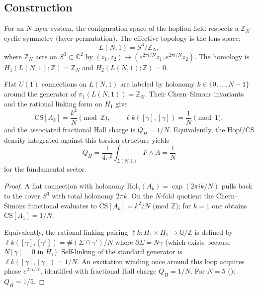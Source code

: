 \documentclass[11pt,letterpaper]{article}
\begin{document}
\subsection{Construction}

For an $N$-layer \TEVC{} system, the configuration space of the hopfion field respects a $\mathbb{Z}_N$ cyclic symmetry (layer permutation). The effective topology is the lens space:
\begin{equation}
L(N,1) = S^3 / \mathbb{Z}_N,
\end{equation}
where $\mathbb{Z}_N$ acts on $S^3 \subset \mathbb{C}^2$ by $(z_1, z_2) \mapsto (e^{2\pi i/N} z_1, e^{2\pi i/N} z_2)$. The homology is $H_1(L(N,1);\mathbb{Z})=\mathbb{Z}_N$ and $H_2(L(N,1);\mathbb{Z})=0$.

\begin{theorem}
\label{thm:lens_hopf}
Flat $U(1)$ connections on $L(N,1)$ are labeled by holonomy $k\in\{0,\ldots,N-1\}$ around the generator of $\pi_1(L(N,1))=\mathbb{Z}_N$. Their Chern--Simons invariants and the rational linking form on $H_1$ give
\begin{equation}
\mathrm{CS}[A_k]=\frac{k^2}{N}\pmod{\mathbb{Z}},\qquad
\ell\!k([\gamma],[\gamma])=\frac{1}{N}\pmod{1},
\end{equation}
and the associated fractional Hall charge is $Q_H=1/N$. Equivalently, the Hopf/CS density integrated against this torsion structure yields
\begin{equation}
Q_H = \frac{1}{4\pi^2} \int_{L(N,1)} F \wedge A = \frac{1}{N}
\end{equation}
for the fundamental sector.
\end{theorem}

\begin{proof}
A flat connection with holonomy $\mathrm{Hol}_\gamma(A_k)=\exp(2\pi i k/N)$ pulls back to the cover $S^3$ with total holonomy $2\pi k$. On the $N$-fold quotient the Chern--Simons functional evaluates to $\mathrm{CS}[A_k]=k^2/N$ (mod $\mathbb{Z}$)\cite{Witten1989,Jeffrey1992}; for $k=1$ one obtains $\mathrm{CS}[A_1]=1/N$.

Equivalently, the rational linking pairing $\ell\!k:H_1\times H_1\to\mathbb{Q}/\mathbb{Z}$ is defined by $\ell\!k([\gamma],[\gamma'])=\#(\Sigma\cap\gamma')/N$ where $\partial\Sigma=N\gamma$ (which exists because $N[\gamma]=0$ in $H_1$). Self-linking of the standard generator is $\ell\!k([\gamma],[\gamma])=1/N$. An excitation winding once around this loop acquires phase $e^{2\pi i/N}$, identified with fractional Hall charge $Q_H=1/N$. For $N=5$ (\MATBG): $Q_H=1/5$.
\end{proof}
\end{document}
